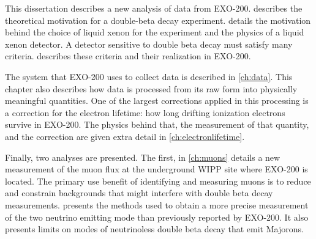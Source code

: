\documentclass[herrin-thesis.tex]{subfiles}
\begin{document}
This dissertation describes a new analysis of data from EXO-200.  describes the theoretical motivation for a double-beta decay experiment.  details the motivation behind the choice of liquid xenon for the experiment and the physics of a liquid xenon detector. A detector sensitive to double beta decay must satisfy many criteria.  describes these criteria and their realization in EXO-200.

The system that EXO-200 uses to collect data is described in \cref{ch:data}. This chapter also describes how data is processed from its raw form into physically meaningful quantities. One of the largest corrections applied in this processing is a correction for the electron lifetime: how long drifting ionization electrons survive in EXO-200. The physics behind that, the measurement of that quantity, and the correction are given extra detail in \cref{ch:electronlifetime}.

Finally, two analyses are presented. The first, in \cref{ch:muons} details a new measurement of the muon flux at the underground WIPP site where EXO-200 is located. The primary use benefit of identifying and measuring muons is to reduce and constrain backgrounds that might interfere with double beta decay measurements.  presents the methods used to obtain a more precise measurement of the two neutrino emitting mode than previously reported by EXO-200. It also presents limits on modes of neutrinoless double beta decay that emit Majorons.
\end{document}
